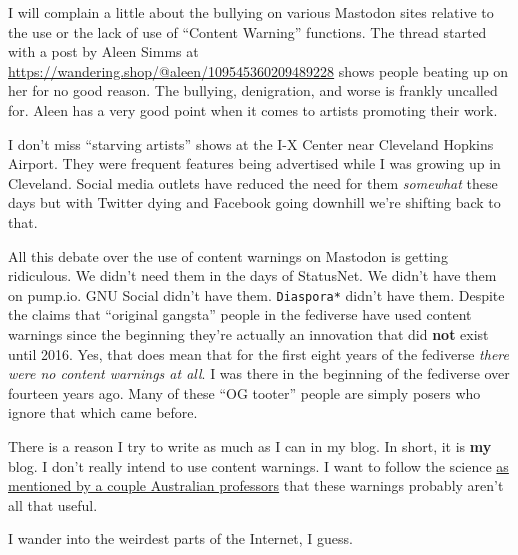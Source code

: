 I will complain a little about the bullying on various Mastodon sites
relative to the use or the lack of use of ``Content Warning'' functions.
The thread started with a post by Aleen Simms at
\url{https://wandering.shop/@aleen/109545360209489228} shows people
beating up on her for no good reason. The bullying, denigration, and
worse is frankly uncalled for. Aleen has a very good point when it comes
to artists promoting their work.

I don't miss ``starving artists'' shows at the I-X Center near Cleveland
Hopkins Airport. They were frequent features being advertised while I
was growing up in Cleveland. Social media outlets have reduced the need
for them \emph{somewhat} these days but with Twitter dying and Facebook
going downhill we're shifting back to that.

All this debate over the use of content warnings on Mastodon is getting
ridiculous. We didn't need them in the days of StatusNet. We didn't have
them on pump.io. GNU Social didn't have them. \texttt{Diaspora*} didn't
have them. Despite the claims that ``original gangsta'' people in the
fediverse have used content warnings since the beginning they're
actually an innovation that did \textbf{not} exist until 2016. Yes, that
does mean that for the first eight years of the fediverse \emph{there
were no content warnings at all}. I was there in the beginning of the
fediverse over fourteen years ago. Many of these ``OG tooter'' people
are simply posers who ignore that which came before.

There is a reason I try to write as much as I can in my blog. In short,
it is \textbf{my} blog. I don't really intend to use content warnings. I
want to follow the science
\href{https://theconversation.com/proceed-with-caution-the-trouble-with-trigger-warnings-192598}{as
mentioned by a couple Australian professors} that these warnings
probably aren't all that useful.

I wander into the weirdest parts of the Internet, I guess.
